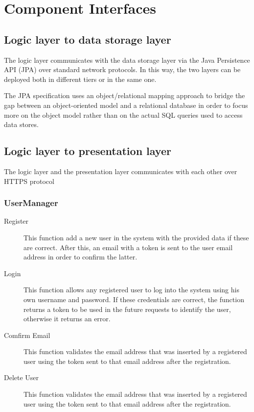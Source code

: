 \section{Component Interfaces}

\subsection{Logic layer to data storage layer}
The logic layer communicates with the data storage layer via the Java Persistence API (JPA) over standard network protocols.
In this way, the two layers can be deployed both in different tiers or in the same one.

The JPA specification uses an object/relational mapping approach to bridge the gap between an object-oriented model and a relational database in order to focus more on the object model rather than on the actual SQL queries used to access data stores.

\subsection{Logic layer to presentation layer}

The logic layer and the presentation layer communicates with each other over HTTPS protocol %

\subsubsection{UserManager}
\begin{description}
	\item[Register] This function add a new user in the system with the provided data if these are correct.
	After this, an email with a token is sent to the user email address in order to confirm the latter.
    \item[Login] This function allows any registered user to log into the system using his own username and password.
    If these credentials are correct, the function returns a token to be used in the future requests to identify the user, otherwise it returns an error.
    \item[Comfirm Email] This function validates the email address that was inserted by a registered user using the token sent to that email address after the registration.
    \item[Delete User] This function validates the email address that was inserted by a registered user using the token sent to that email address after the registration.
\end{description}
